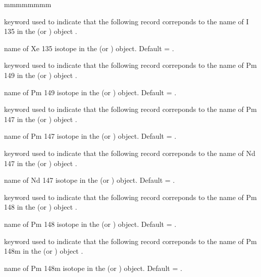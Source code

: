 \begin{ListeDeDescription}{mmmmmmmm}
\item[\moc{I135}]  keyword used to indicate that the following record correponds to the name of I 135 in the  (or )   object .

\item[\dusa{inam}]  name of Xe 135 isotope in the  (or )   object. Default  = 
.

\item[\moc{PM149}]  keyword used to indicate that the following record correponds to the name of Pm 149 in the  (or )   object .

\item[\dusa{pmnam}]  name of Pm 149 isotope in the  (or )   object. Default  = 
.

\item[\moc{PM147}]  keyword used to indicate that the following record correponds to the name of Pm 147 in the  (or )   object .

\item[\dusa{pm47nam}]  name of Pm 147 isotope in the  (or )   object. Default  = 
.

\item[\moc{ND147}]  keyword used to indicate that the following record correponds to the name of Nd 147 in the  (or )   object .

\item[\dusa{nd47nam}]  name of Nd 147 isotope in the  (or )   object. Default  = 
.


\item[\moc{PM148}]  keyword used to indicate that the following record correponds to the name of Pm 148 in the  (or )   object .

\item[\dusa{pm47nam}]  name of Pm 148 isotope in the  (or )   object. Default  = 
.

\item[\moc{PM148M}]  keyword used to indicate that the following record correponds to the name of Pm 148m in the  (or )   object .

\item[\dusa{pm48mnam}]  name of Pm 148m isotope in the  (or )   object. Default  = 
.


\end{ListeDeDescription}
